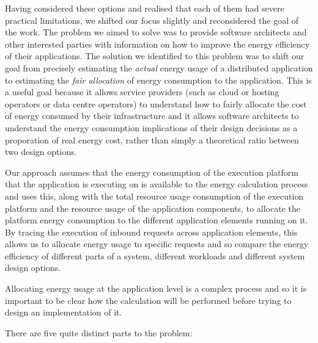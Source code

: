Having considered these options and realised that each of them had severe practical limitations, we shifted our focus slightly and reconsidered the goal of the work.  The problem we aimed to solve was to provide software architects and other interested parties with information on how to improve the energy efficiency of their applications.  The solution we identified to this problem was to shift our  goal from precisely estimating the \emph{actual} energy usage of a distributed application to estimating the \emph{fair allocation} of energy consumption to the application.  This is a useful goal because it allows service providers (such as cloud or hosting operators or data centre operators) to understand how to fairly allocate the cost of energy consumed by their infrastructure and it allows software architects to understand the energy consumption implications of their design decisions as a proporation of real energy cost, rather than simply a theoretical ratio between two design options.

Our approach assumes that the energy consumption of the execution platform that the application is executing on is available to the energy calculation process and uses this, along with the total resource usage consumption of the execution platform and the resource usage of the application components, to allocate the platform energy consumption to the different application elements running on it.  By tracing the execution of inbound requests across application elements, this allows us to allocate energy usage to specific requests and so compare the energy efficiency of different parts of a system, different workloads and different system design options.

Allocating energy usage at the application level is a complex process and so it is important to be clear how the calculation will be performed before trying to design an implementation of it.

There are five quite distinct parts to the problem:


